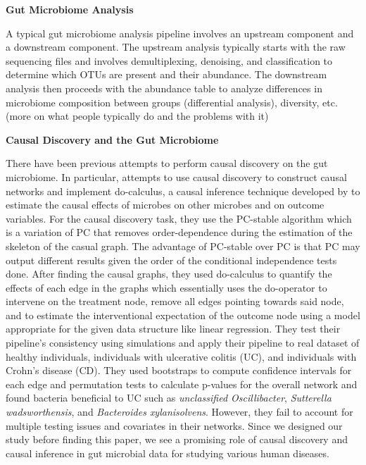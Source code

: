\documentclass[12pt,letterpaper]{article}
\begin{document}
\textbf{Gut Microbiome Analysis}

A typical gut microbiome analysis pipeline involves an upstream component and a downstream component. The upstream analysis typically starts with the raw sequencing files and involves demultiplexing, denoising, and classification to determine which OTUs are present and their abundance. The downstream analysis then proceeds with the abundance table to analyze differences in microbiome composition between groups (differential analysis), diversity, etc. (more on what people typically do and the problems with it) \newline

\textbf{Causal Discovery and the Gut Microbiome}

There have been previous attempts to perform causal discovery on the gut microbiome. In particular, \citep{sazal2021causalgut} attempts to use causal discovery to construct causal networks and implement do-calculus, a causal inference technique developed by \citep{pearl2016primer} to estimate the causal effects of microbes on other microbes and on outcome variables. For the causal discovery task, they use the PC-stable algorithm \citep{colombo2014pcstable} which is a variation of PC that removes order-dependence during the estimation of the skeleton of the casual graph. The advantage of PC-stable over PC is that PC may output different results given the order of the conditional independence tests done. After finding the causal graphs, they used do-calculus to quantify the effects of each edge in the graphs which essentially uses the do-operator to intervene on the treatment node, remove all edges pointing towards said node, and to estimate the interventional expectation of the outcome node using a model appropriate for the given data structure like linear regression. They test their pipeline’s consistency using simulations and apply their pipeline to real dataset of healthy individuals, individuals with ulcerative colitis (UC), and individuals with Crohn’s disease (CD). They used bootstraps to compute confidence intervals for each edge and permutation tests to calculate p-values for the overall network and found bacteria beneficial to UC such as \textit{unclassified Oscillibacter}, \textit{Sutterella wadsworthensis}, and \textit{Bacteroides xylanisolvens}. However, they fail to account for multiple testing issues and covariates in their networks. Since we designed our study before finding this paper, we see a promising role of causal discovery and causal inference in gut microbial data for studying various human diseases. 
\end{document}
